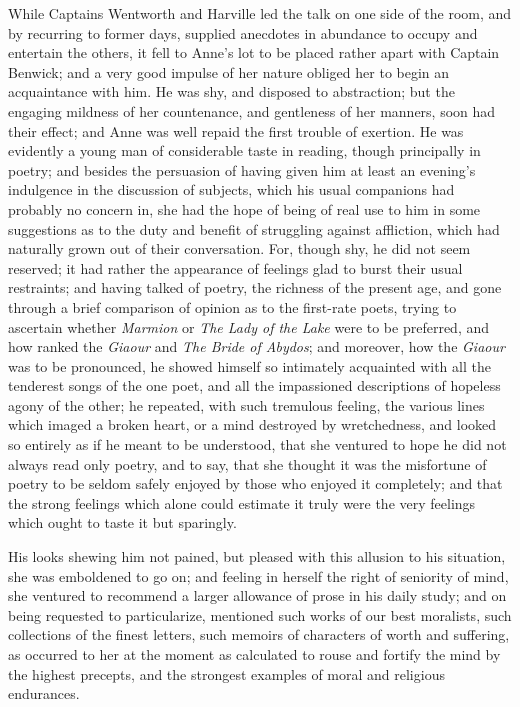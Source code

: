 While Captains Wentworth and Harville led the talk on one side of the room, and by recurring to former days, supplied anecdotes in abundance to occupy and entertain the others, it fell to Anne's lot to be placed rather apart with Captain Benwick; and a very good impulse of her nature obliged her to begin an acquaintance with him. He was shy, and disposed to abstraction; but the engaging mildness of her countenance, and gentleness of her manners, soon had their effect; and Anne was well repaid the first trouble of exertion. He was evidently a young man of considerable taste in reading, though principally in poetry; and besides the persuasion of having given him at least an evening's indulgence in the discussion of subjects, which his usual companions had probably no concern in, she had the hope of being of real use to him in some suggestions as to the duty and benefit of struggling against affliction, which had naturally grown out of their conversation. For, though shy, he did not seem reserved; it had rather the appearance of feelings glad to burst their usual restraints; and having talked of poetry, the richness of the present age, and gone through a brief comparison of opinion as to the first-rate poets, trying to ascertain whether \textit{Marmion} or \textit{The Lady of the Lake} were to be preferred, and how ranked the \textit{Giaour} and \textit{The Bride of Abydos}; and moreover, how the \textit{Giaour} was to be pronounced, he showed himself so intimately acquainted with all the tenderest songs of the one poet, and all the impassioned descriptions of hopeless agony of the other; he repeated, with such tremulous feeling, the various lines which imaged a broken heart, or a mind destroyed by wretchedness, and looked so entirely as if he meant to be understood, that she ventured to hope he did not always read only poetry, and to say, that she thought it was the misfortune of poetry to be seldom safely enjoyed by those who enjoyed it completely; and that the strong feelings which alone could estimate it truly were the very feelings which ought to taste it but sparingly.

His looks shewing him not pained, but pleased with this allusion to his situation, she was emboldened to go on; and feeling in herself the right of seniority of mind, she ventured to recommend a larger allowance of prose in his daily study; and on being requested to particularize, mentioned such works of our best moralists, such collections of the finest letters, such memoirs of characters of worth and suffering, as occurred to her at the moment as calculated to rouse and fortify the mind by the highest precepts, and the strongest examples of moral and religious endurances.


